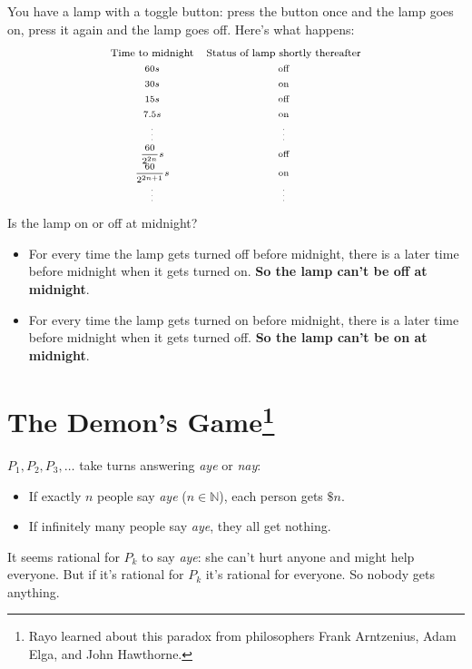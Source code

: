 \documentclass[12pt]{extarticle}
\begin{document}
You have a lamp with a toggle button: press the button once and the lamp goes on, press it again and the lamp goes off. Here's what happens:
\[
\begin{array}{cc}
\text{\footnotesize Time to midnight} & \text{\footnotesize Status of lamp shortly thereafter} \\
\text{\scriptsize 60$s$} & \text{\scriptsize off} \\
\text{\scriptsize 30$s$} & \text{\scriptsize on}\\ %
\text{\scriptsize 15$s$} & \text{\scriptsize off}\\%
\text{\scriptsize 7.5$s$} & \text{\scriptsize on}\\ %

\text{\tiny\vdots} & \text{\tiny\vdots}\\
\text{\scriptsize $\dfrac{60}{2^{2n}}s$} & \text{\scriptsize off}\\ %
\text{\scriptsize $\dfrac{60}{2^{2n+1}}s$} & \text{\scriptsize on}\\%
\text{\tiny\vdots} & \text{\tiny\vdots}\\
\end{array}
\]
Is the lamp on or off at midnight?
\begin{itemize}
\item For every time the lamp gets turned off before midnight, there is a later time before midnight when it gets turned on. \textbf{So the lamp can't be off at midnight}.

\item For every time the lamp gets turned on before midnight, there is a later time before midnight when it gets turned off. \textbf{So the lamp can't be on at midnight}.

\end{itemize}


\section{The Demon's Game\footnote{Rayo learned about this paradox from philosophers Frank Arntzenius, Adam Elga, and John Hawthorne.} {\normalsize {}}}

\(P_1,P_2,P_3,\ldots\) take turns answering  \emph{aye} or \emph{nay}:

\begin{itemize}
\item If exactly $n$ people say \emph{aye} ($n \in \mathbb{N}$), each person gets $\$n$. 

\item If infinitely many people say \emph{aye}, they all get nothing.

\end{itemize}
It seems rational for $P_k$ to say \emph{aye}: she can't hurt anyone and might help everyone. But if it's rational for $P_k$ it's rational for everyone. So nobody gets anything.
\end{document}
